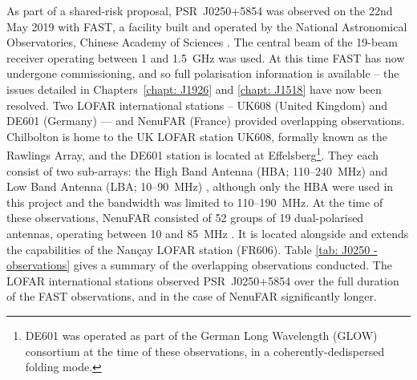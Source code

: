 As part of a shared-risk proposal, PSR~J0250+5854 was observed on the 22nd May 2019 with FAST, a facility built and operated by the National Astronomical Observatories, Chinese Academy of Sciences \citep{NLJ+2011,LWQ+2018}. The central beam of the 19-beam receiver operating between 1 and 1.5~GHz \citep{JTH+2020} was used. At this time FAST has now undergone commissioning, and so full polarisation information is available -- the issues detailed in Chapters~\ref{chapt: J1926} and \ref{chapt: J1518} have now been resolved. Two LOFAR international stations -- UK608 (United Kingdom) and DE601 (Germany) --- and NenuFAR (France) provided overlapping observations. Chilbolton is home to the UK LOFAR station UK608, formally known as the Rawlings Array, and the DE601 station is located at Effelsberg\footnote{DE601 was operated as part of the German Long Wavelength (GLOW) consortium at the time of these observations, in a coherently-dedispersed folding mode.}. They each consist of two sub-arrays: the High Band Antenna (HBA; 110--240~MHz) and Low Band Antenna (LBA; 10--90~MHz) \citep{HWG+2013,SHA+2011}, although only the HBA were used in this project and the bandwidth was limited to 110--190~MHz. At the time of these observations, NenuFAR consisted of 52 groups of 19 dual-polarised antennas, operating between 10 and 85~MHz \citep{ZDT+2020}. It is located alongside and extends the capabilities of the Nan\c{c}ay LOFAR station (FR606). Table \ref{tab: J0250 - observations} gives a summary of the overlapping observations conducted. The LOFAR international stations observed PSR~J0250+5854 over the full duration of the FAST observations, and in the case of NenuFAR significantly longer.

